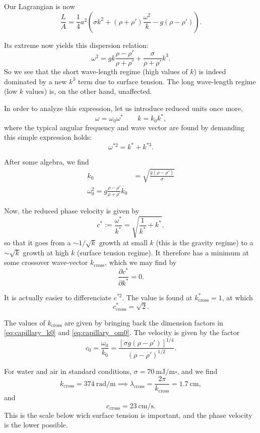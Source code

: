 Our Lagrangian is now
\[
  \frac{L}{A} = \frac14 a^2
  \left(
    \sigma  k^2 + 
    (\rho+\rho') \frac{ \omega^2  }{ k } -
    g (\rho-\rho')
  \right) .
\]

Its extreme now yields this dispersion relation:
\[
  \omega^2  =    g  k \frac{\rho-\rho'}{\rho + \rho'} +
  \frac{\sigma}{\rho+\rho'} k^3 .
\]
So we see that the short wave-length regime (high values of $k$) is
indeed dominated by a new $k^3$ term due to surface tension. The long
wave-length regime (low $k$ values) is, on the other hand, unaffected.

In order to analyze this expression, let us introduce reduced units
once more,
\[
\omega=\omega_0 \omega^* \qquad k = k_0 k^* ,
\]
where the typical angular frequency and wave vector are found by
demanding this simple expression holds:
\[
\omega^{*2}= k^* + k^{*3} .
\]

After some algebra, we find
\begin{align}
  \label{eq:capillary_k0}
  k_0&=\sqrt{\frac{ g (\rho-\rho') }{ \sigma }} \\
  \label{eq:capillary_om0}
  \omega_0^2 = g  \frac{ \rho-\rho' }{ \rho + \rho' } k_0
\end{align}


Now, the reduced phase velocity is given by
\[
  c^* := \frac{\omega^*}{k^*} =
  \sqrt{\frac{1}{k^*} +  k^* } ,
\]
so that it goes from a $\sim 1/\sqrt{k} $ growth at small $k$ (this is
the gravity regime) to a $\sim \sqrt{k} $ growth at high $k$ (surface
tension regime). It therefore has a minimum at some crossover
wave-vector $k_\mathrm{cross}$, which we may find by
\[
\frac{\partial c^* }{\partial k^*} = 0 .
\]

It is actually easier to differenciate $c^{*2}$. The value is found at
$k^*_\mathrm{cross} = 1$, at which
\[
c^*_\mathrm{cross} = \sqrt{2} .
\]

The values of $k_\mathrm{cross} $ are given by bringing back the
dimension factors in \ref{eq:capillary_k0} and \ref{eq:capillary_om0}.
The velocity is given by the factor
\[
  c_0 = \frac{\omega_0}{k_0} =
  \frac{[\sigma g (\rho-\rho')]^{1/4}}{(\rho-\rho')^{1/2}} .
\]

For water and air in standard conditions,
$\sigma=\SI{70}{\milli\joule\per\meter\square}$,
and we find
\[
  k_\mathrm{cross} = \SI{374}{\radian\per\meter} \implies
  \lambda_\mathrm{cross} = \frac{2\pi}{k_\mathrm{cross}}=
  \SI{1.7}{\centi\meter} ,
\]
and
\[
  c_\mathrm{cross} =  \SI{23}{\centi\meter\per\second} .
\]
This is the scale below wich surface tension is important, and the
phase velocity is the lower possible.

